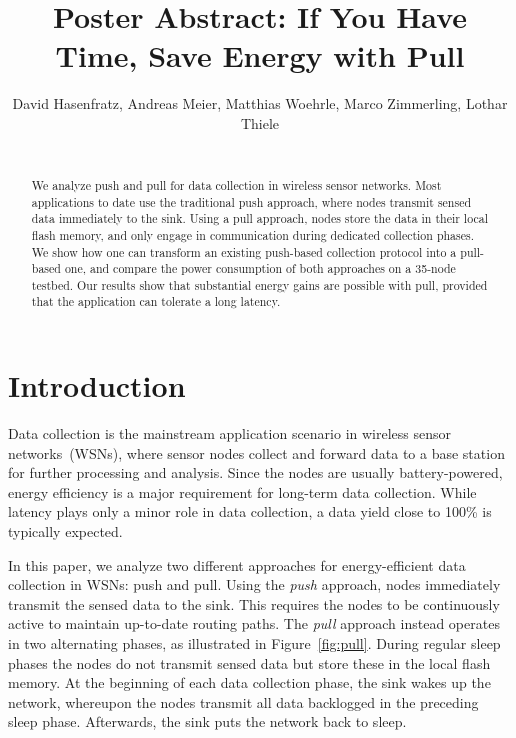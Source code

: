 \documentclass[10pt]{sensys-abstract}
\newcommand\figref[1]{Figure~\ref{#1}}
\begin{document}
\title{Poster Abstract: If You Have Time, Save Energy with Pull}

\author{
\alignauthor David Hasenfratz, Andreas Meier, Matthias Woehrle, Marco Zimmerling, Lothar Thiele\\
\\}

\maketitle

\begin{abstract}
We analyze push and pull for data collection in wireless sensor networks. Most applications to date use the traditional push approach, where nodes transmit sensed data immediately to the sink. Using a pull approach, nodes store the data in their local flash memory, and only engage in communication during dedicated collection phases. We show how one can transform an existing push-based collection protocol into a pull-based one, and compare the power consumption of both approaches on a 35-node testbed. Our results show that substantial energy gains are possible with pull, provided that the application can tolerate a long latency.
\end{abstract}

\section{Introduction}

Data collection is the mainstream application scenario in wireless sensor networks~(WSNs), where sensor nodes collect and forward data to a base station for further processing and analysis. Since the nodes are usually battery-powered, energy efficiency is a major requirement for long-term data collection. While latency plays only a minor role in data collection, a data yield close to 100\% is typically expected.

In this paper, we analyze two different approaches for energy-efficient data collection in WSNs: push and pull. Using the \emph{push} approach, nodes immediately transmit the sensed data to the sink. This requires the nodes to be continuously active to maintain up-to-date routing paths. The \emph{pull} approach instead operates in two alternating phases, as illustrated in \figref{fig:pull}. During regular sleep phases the nodes do not transmit sensed data but store these in the local flash memory. At the beginning of each data collection phase, the sink wakes up the network, whereupon the nodes transmit all data backlogged in the preceding sleep phase. Afterwards, the sink puts the network back to sleep.
\end{document}
